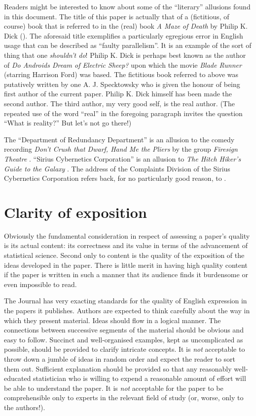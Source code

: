 \documentclass[times, doublespace]{anzsauth}
\begin{document}
Readers might be interested to know about some of the ``literary''
allusions found in this document.  The title of this paper
is actually that of a (fictitious, of course) book that is
referred to in the (real) book \textit{A Maze of Death} by Philip
K. Dick (\citeyear{Dick1971}).  The aforesaid title exemplifies a
particularly egregious error in English usage that can be described
as ``faulty parallelism''.  It is an example of the sort of thing
that one \emph{shouldn't do}!  Philip K. Dick is perhaps best
known as the author of \textit{Do Androids Dream of Electric Sheep?}
\citep{Dick1968} upon which the movie \textit{Blade Runner} (starring
Harrison Ford) was based.  The fictitious book referred to above was
putatively written by one A. J. Specktowsky who is given the honour
of being first author of the current paper.  Philip K. Dick himself
has been made the second author.  The third author, my very good
self, is the real author.  (The repeated use of the word ``real''
in the foregoing paragraph invites the question ``What is reality?''
But let's not go there!)

The ``Department of Redundancy Department'' is an allusion to
the comedy recording \textit{Don't Crush that Dwarf, Hand Me the
Pliers} by the group \textit{Firesign Theatre} \citep{Firesign1970}.
``Sirius Cybernetics Corporation'' is an allusion to \textit{The
Hitch Hiker's Guide to the Galaxy} \citep{Adams1979}.  The address
of the Complaints Division of the Sirius Cybernetics Corporation
refers back, for no particularly good reason, to \cite{Firesign1970}.

\section{Clarity of exposition}
\label{sec:clarExpos}

Obviously the fundamental consideration in respect of assessing a
paper's quality is its actual content: its correctness and its value
in terms of the advancement of statistical science.  Second only to
content is the quality of the exposition of the ideas developed in
the paper.  There is little merit in having high quality content
if the paper is written in such a manner that its audience finds
it burdensome or even impossible to read.

The Journal has very exacting standards for the quality of English
expression in the papers it publishes.  Authors are expected to
think carefully about the way in which they present material.
Ideas should flow in a logical manner.  The connections between
successive segments of the material should be obvious and easy to
follow.  Succinct and well-organised examples, kept as uncomplicated
as possible, should be provided to clarify intricate concepts.
It is \emph{not} acceptable to throw down a jumble of ideas in random
order and expect the reader to sort them out.  Sufficient explanation
should be provided so that any reasonably well-educated statistician
who is willing to expend a reasonable amount of effort will be able
to understand the paper.  It is \emph{not} acceptable for the paper
to be comprehensible only to experts in the relevant field of study
(or, worse, only to the authors!).
\end{document}
